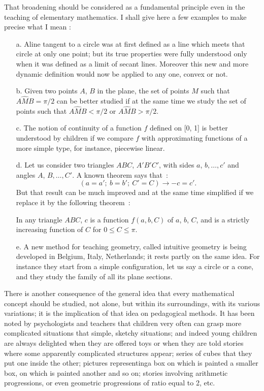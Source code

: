 That broadening should be considered as a fundamental principle even in the teaching of elementary mathematics. I shall give here a few examples to make precise what I mean :
\begin{itemize}
\item[a.] A\pageoriginale line tangent to a circle was at first defined as a line which meets that circle at only one point; but its true properties were fully understood only when it was defined as a limit of secant lines. Moreover this new and more dynamic definition would now be applied to any one, convex or not.

\item[b.] Given two points $A$, $B$ in the plane, the set of points $M$ such that $A\widehat{M}B=\pi/2$ can be better studied if at the same time we study the set of points such that $A\widehat{M}B<\pi /2$ or $A\widehat{M}B>\pi/2$.

\item[c.] The notion of continuity of a function $f$ defined on [0, 1] is better understood by children if we compare $f$ with approximating functions of a more simple type, for instance, piecewise linear.

\item[d.] Let us consider two triangles $ABC$, $A'B'C'$, with sides $a$, $b,\ldots,c'$ and angles $A$, $B,\ldots,C'$. A known theorem says that~:
$$
(a=a';~ b=b';~ C'=C)\to -c=c'.
$$
But that result can be much improved and at the same time simplified if we replace it by the following theorem~:

In any triangle $ABC$, $c$ is a function $f(a,b,C)$ of $a$, $b$, $C$, and is a strictly increasing function of $C$ for $0\leq C\leq \pi$.

\item[e.] A new method for teaching geometry, called intuitive geometry is being developed in Belgium, Italy, Netherlands; it rests partly on the same idea. For instance they start from a simple configuration, let us say a circle or a cone, and they study the family of all its plane sections.
\end{itemize}

There is another consequence of the general idea that every mathematical concept should be studied, not alone, but within its surroundings, with its various variations; it is the implication of that idea on pedagogical methods. It has been noted by psychologists and teachers that children very often can grasp more complicated situations that simple, sketchy situations; and indeed young children are always delighted when they are offered toys or when they are told stories where some apparently complicated structures appear; series of cubes that they put one inside the other; pictures representing\pageoriginale a box on which is painted a smaller box, on which is painted another and so on; stories involving arithmetic progressions, or even geometric progressions of ratio equal to 2, etc.

